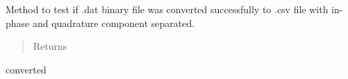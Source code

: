 \documentclass[letterpaper,10pt,english]{sphinxmanual}
\begin{document}
\begin{fulllineitems}

\begin{fulllineitems}
\label{\detokenize{test:test.TestParser.test_raw}}
Method to test if .dat binary file was converted successfully to .csv file with in-phase and quadrature
component separated.
\begin{quote}\begin{description}
\item[{Returns}] \leavevmode


\end{description}\end{quote}

converted

\end{fulllineitems}


\end{fulllineitems}






\renewcommand{\indexname}{Python Module Index}
\begin{sphinxtheindex}
\let\bigletter\sphinxstyleindexlettergroup
\bigletter{t}
\item\relax{}
\item\relax{}
\indexspace
\bigletter{x}
\item\relax{}
\item\relax{}
\end{sphinxtheindex}

\renewcommand{\indexname}{Index}
\printindex
\end{document}
